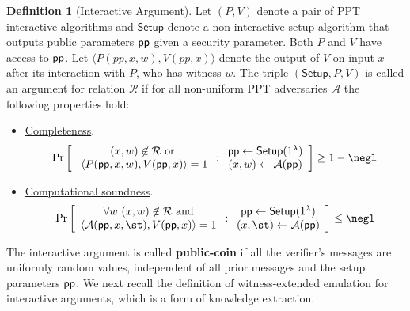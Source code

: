 \documentclass{article}
\theoremstyle{definition}
\newtheorem{definition}{Definition}
\begin{document}
\begin{definition} [Interactive Argument]
Let $(P, V)$ denote a pair of PPT interactive algorithms and $\textsf{Setup}$ denote a non-interactive setup algorithm that outputs public parameters $\textsf{pp}$ given a security parameter. Both $P$ and $V$ have access to $\textsf{pp}$. Let $\langle P(pp, x, w), V(pp, x) \rangle$ denote the output of $V$ on input $x$ after its interaction with $P$, who has witness $w$. The triple $(\textsf{Setup}, P, V)$ is called an argument for relation $\mathcal{R}$ if for all non-uniform PPT adversaries $\mathcal{A}$ the following properties hold: 

\begin{itemize}
\item \underline{Completeness}. 
\[
\Pr \left[
\begin{array}{c}
        (x, w) \not \in  \mathcal{R} \ \text{or} \\
         \ \langle P(\params, x, w), V(\params, x) \rangle = 1 \\
\end{array}
:
\begin{array}{c}
             \params \leftarrow \textsf{Setup}(1^\lambda) \\
             (x, w) \leftarrow \mathcal{A}(\params) \\
\end{array} 
\right]  \geq 1 - \negl 
 \]

\item \underline{Computational soundness}. 
\[
\Pr \left[
\begin{array}{c}
        \forall w \ (x, w) \not\in  \mathcal{R} \ \text{and} \\ 
         \langle \mathcal{A}(\params, x, \st), V(\params, x) \rangle = 1 
\end{array}
:
\begin{array}{c}
             \params \leftarrow \textsf{Setup}(1^\lambda) \\
             (x, \st) \leftarrow \mathcal{A}(\params) \\
\end{array}
        \right] \leq \negl
\]
\end{itemize} 
\end{definition} 

The interactive argument is called \textbf{public-coin} if all the verifier's messages are uniformly random values, independent of all prior messages and the setup parameters $\textsf{pp}$. 
We next recall the definition of witness-extended emulation for interactive arguments, which is a form of knowledge extraction.  
\end{document}
